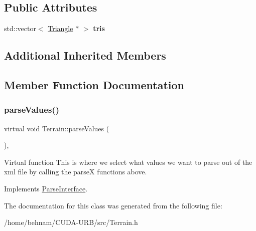 \subsection*{Public Attributes}
\begin{DoxyCompactItemize}
\item 
\mbox{\label{classTerrain_a3b009bdeb1860fd2a88ed060cf0ac32b}} 
std\+::vector$<$ \hyperlink{classTriangle}{Triangle} $\ast$ $>$ {\bfseries tris}
\end{DoxyCompactItemize}
\subsection*{Additional Inherited Members}


\subsection{Member Function Documentation}
\mbox{\label{classTerrain_a4258f6f5195a3be6c7afa3e4f03bd227}} 
\subsubsection{\texorpdfstring{parse\+Values()}{parseValues()}}
{\footnotesize\ttfamily virtual void Terrain\+::parse\+Values (\begin{DoxyParamCaption}{ }\end{DoxyParamCaption})\hspace{0.3cm}{\ttfamily [inline]}, {\ttfamily [virtual]}}

Virtual function This is where we select what values we want to parse out of the xml file by calling the parseX functions above. 

Implements \hyperlink{classParseInterface_afca32108192ba0997c9e5a78189b0cbc}{Parse\+Interface}.



The documentation for this class was generated from the following file\+:\begin{DoxyCompactItemize}
\item 
/home/behnam/\+C\+U\+D\+A-\/\+U\+R\+B/src/Terrain.\+h\end{DoxyCompactItemize}
